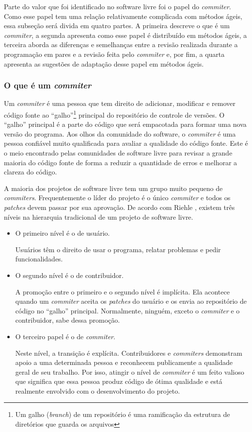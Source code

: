 Parte do valor que foi identificado no software livre foi o papel do
\emph{commiter}. Como esse papel tem uma relação relativamente
complicada com métodos ágeis, essa subseção será divida em quatro
partes. A primeira descreve o que é um \emph{commiter}, a segunda
apresenta como esse papel é distribuído em métodos ágeis, a terceira
aborda as diferenças e semelhanças entre a revisão realizada durante a
programação em pares e a revisão feita pelo \emph{commiter} e, por
fim, a quarta apresenta as sugestões de adaptação desse papel em
métodos ágeis.


\subsubsection{O que é um \emph{commiter}}

Um \emph{commiter} é uma pessoa que tem direito de adicionar,
modificar e remover código fonte ao ``galho''\footnote{Um galho
  (\emph{branch}) de um repositório é uma ramificação da estrutura de
  diretórios que guarda os arquivos} principal do repositório de
controle de versões. O ``galho'' principal é a parte do código que
será empacotada para formar uma nova versão do programa. Aos olhos da
comunidade do software, o \emph{commiter} é uma pessoa confiável muito
qualificada para avaliar a qualidade do código fonte. Este é o meio
encontrado pelas comunidades de software livre para revisar a grande
maioria do código fonte de forma a reduzir a quantidade de erros e
melhorar a clareza do código.

A maioria dos projetos de software livre tem um grupo muito pequeno de
\emph{commiters}. Frequentemente o líder do projeto é o único
\emph{commiter} e todos os \emph{patches} devem passar por sua
aprovação. De acordo com Riehle \cite{Riehle2007}, existem três níveis
na hierarquia tradicional de um projeto de software livre.
\begin{itemize}
\item O primeiro nível é o de usuário.

  Usuários têm o direito de usar o programa, relatar problemas e pedir
  funcionalidades.
\item O segundo nível é o de contribuidor.

  A promoção entre o primeiro e o segundo nível é implícita. Ela
  acontece quando um \emph{commiter} aceita os \emph{patches} do
  usuário e os envia ao repositório de código no ``galho''
  principal. Normalmente, ninguém, exceto o \emph{commiter} e o
  contribuidor, sabe dessa promoção.
\item O terceiro papel é o de \emph{commiter}.

  Neste nível, a transição é explícita. Contribuidores e
  \emph{commiters} demonstram apoio a uma determinada pessoa e
  reconhecem publicamente a qualidade geral de seu trabalho. Por isso,
  atingir o nível de \emph{commiter} é um feito valioso que significa
  que essa pessoa produz código de ótima qualidade e está realmente
  envolvido com o desenvolvimento do projeto.
\end{itemize}

